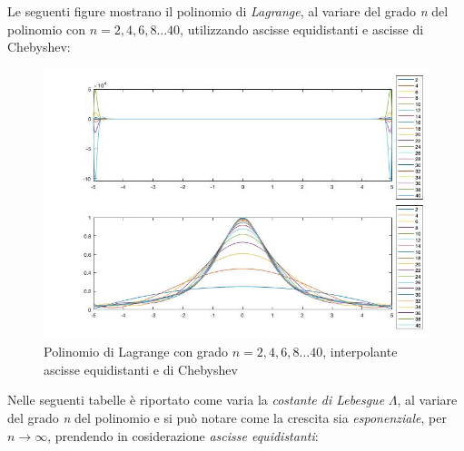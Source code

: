 Le seguenti figure mostrano il polinomio di \textit{Lagrange}, al variare del grado \textit{n} del polinomio con $n=2,4,6,8...40$, utilizzando ascisse equidistanti e ascisse di Chebyshev:
\begin{figure}[H]
	\includegraphics[width=\textwidth]{Chapter-4/Exercise-19/plot.jpg}
	\caption*{Polinomio di Lagrange con grado $n=2,4,6,8...40$, interpolante ascisse equidistanti e di Chebyshev}
\end{figure}
Nelle seguenti tabelle è riportato come varia la \textit{costante di Lebesgue} $\Lambda$, al variare del grado \textit{n} del polinomio e si può notare come la crescita sia \textit{esponenziale}, per $n\rightarrow\infty$, prendendo in cosiderazione \textit{ascisse equidistanti}:\\\
